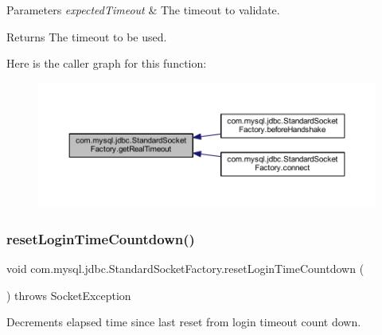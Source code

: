 \begin{DoxyParams}{Parameters}
{\em expected\+Timeout} & The timeout to validate. \\
\hline
\end{DoxyParams}
\begin{DoxyReturn}{Returns}
The timeout to be used. 
\end{DoxyReturn}
Here is the caller graph for this function\+:
\nopagebreak
\begin{figure}[H]
\begin{center}
\leavevmode
\includegraphics[width=350pt]{classcom_1_1mysql_1_1jdbc_1_1_standard_socket_factory_ae455f41cfd47611b1f979ce4c2f7cbec_icgraph}
\end{center}
\end{figure}
\mbox{\label{classcom_1_1mysql_1_1jdbc_1_1_standard_socket_factory_ad78f473677314a3dc66e326b8dd3ba2a}} 
\subsubsection{\texorpdfstring{reset\+Login\+Time\+Countdown()}{resetLoginTimeCountdown()}}
{\footnotesize\ttfamily void com.\+mysql.\+jdbc.\+Standard\+Socket\+Factory.\+reset\+Login\+Time\+Countdown (\begin{DoxyParamCaption}{ }\end{DoxyParamCaption}) throws Socket\+Exception\hspace{0.3cm}{\ttfamily [protected]}}

Decrements elapsed time since last reset from login timeout count down.


